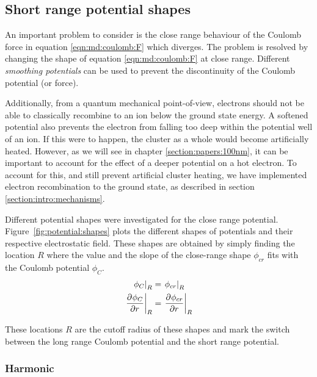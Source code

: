 \subsection{Short range potential shapes}
\label{section:intro:md:potentials}

An important problem to consider is the close range behaviour of the Coulomb force
in equation \eqref{eqn:md:coulomb:F} which diverges. The problem is resolved by
changing the shape of equation \eqref{eqn:md:coulomb:F} at close range.
Different \textit{smoothing potentials} can be used to prevent the
discontinuity of the Coulomb potential (or force).

Additionally, from a quantum mechanical point-of-view, electrons should not be
able to classically recombine to an ion below the ground state energy.
A softened potential also prevents the electron from falling too deep within the
potential well of an ion. If this were to happen, the cluster as a whole would
become artificially heated. However, as we will see in chapter
\ref{section:papers:100nm}, it can be
important to account for the effect of a deeper potential on a hot electron. To
account for this, and still prevent artificial cluster heating, we have
implemented electron recombination to the ground state, as described in section
\ref{section:intro:mechanisms}.

Different potential shapes were investigated for the close range potential.
Figure~\ref{fig:potential:shapes} plots the different shapes of potentials and
their respective electrostatic field. These shapes are obtained by simply
finding the location $R$ where the value and the slope of the close-range shape
$\phi_{cr}$ fits with the Coulomb potential $\phi_C$.
\begin{subequations}
\begin{align}
\left. \phi_C        \right|_{R} & = \left. \phi_{cr} \right|_{R} \\
\left. \frac{\partial^{{}} \phi_C}{\partial r^{{}}} \right|_{R} & = \left. \frac{\partial^{{}} \phi_{cr}}{\partial r^{{}}} \right|_{R}
\end{align}
\label{eqn:potential:to_match}
\end{subequations}

These locations $R$ are the cutoff radius of these shapes and mark the switch
between the long range Coulomb potential and the short range potential.


\subsubsection{Harmonic}

